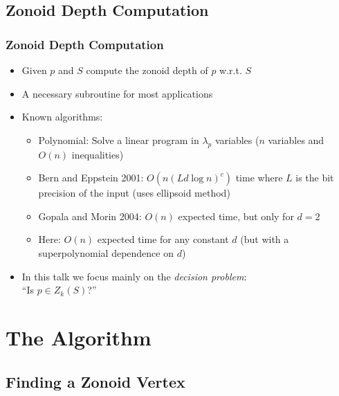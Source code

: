 \documentclass{beamer}
\begin{document}
{\subsection{Zonoid Depth Computation}
\frame
{
  \frametitle{Zonoid Depth Computation}
  \begin{itemize}
  \item<1-> Given $p$ and $S$ compute the zonoid depth of $p$
w.r.t. $S$
  \item<2-> A necessary subroutine for most applications
  \item<3-> Known algorithms:
     \begin{itemize}  
       \item<4-> Polynomial: Solve a linear program in $\lambda_p$ 
		variables ($n$ variables and $O(n)$ inequalities)
       \item<5-> Bern and Eppstein 2001:  $O(n(Ld\log n)^c)$ time where $L$
            is the bit precision of the input  (uses ellipsoid method)
       \item<6-> Gopala and Morin 2004: $O(n)$ expected time, but only
            for $d=2$
       \item<7-> Here: $O(n)$ expected time for any constant $d$ (but
            with a superpolynomial dependence on $d$)
     \end{itemize}
     \item<8-> In this talk we focus mainly on the \emph{decision 
          problem}:  \\ ``Is $p\in Z_k(S)$?''
  \end{itemize}
}


\section{The Algorithm}

\subsection{Finding a Zonoid Vertex}


}
\end{document}
